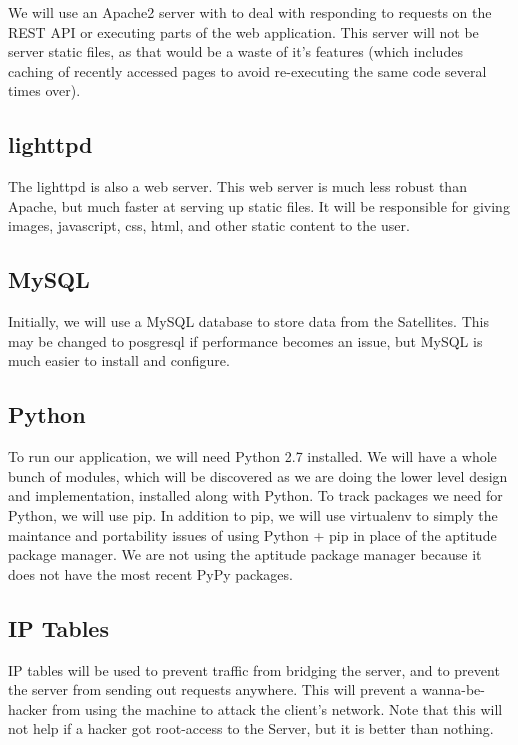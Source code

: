 We will use an Apache2 server with  to deal with responding to requests on the \ac{REST} \ac{API} or executing parts of the web application.
This server will not be server static files, as that would be a waste of it's features (which includes caching of recently accessed pages to avoid re-executing the same code several times over).

\subsection{lighttpd}

The lighttpd is also a web server.
This web server is much less robust than Apache, but much faster at serving up static files.
It will be responsible for giving images, javascript, css, html, and other static content to the user.

\subsection{MySQL}

Initially, we will use a MySQL database to store data from the Satellites.
This may be changed to posgresql if performance becomes an issue, but MySQL is much easier to install and configure.

\subsection{Python}

To run our application, we will need Python 2.7 installed.
We will have a whole bunch of modules, which will be discovered as we are doing the lower level design and implementation, installed along with Python.
To track packages we need for Python, we will use pip.
In addition to pip, we will use virtualenv to simply the maintance and portability issues of using Python + pip in place of the aptitude package manager.
We are not using the aptitude package manager because it does not have the most recent PyPy packages.

\subsection{\ac{IP} Tables}

\ac{IP} tables will be used to prevent traffic from bridging the server, and to prevent the server from sending out requests anywhere.
This will prevent a wanna-be-hacker from using the machine to attack the client's network.
Note that this will not help if a hacker got root-access to the Server, but it is better than nothing.

